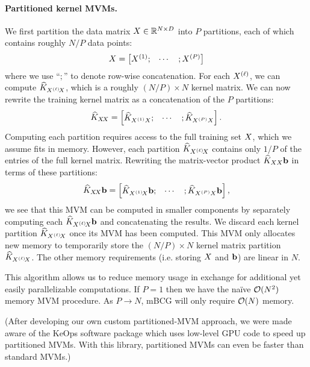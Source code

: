 \paragraph{Partitioned kernel MVMs.}
We first partition the data matrix $X \in \mathbb{R}^{N \times D}$ into $P$ partitions, each of which contains roughly $N/P$ data points:
%
\[
  X = \begin{bmatrix}
    X^{(1)}; &
    \cdots &
    ; X^{(P)}
  \end{bmatrix}
\]
%
where we use ``$;$'' to denote row-wise concatenation.
For each $X^{(\ell)}$, we can compute $\widehat {K}_{X^{(\ell)}\!X}$, which is a roughly $(N / P) \times N$ kernel matrix.
We can now rewrite the training kernel matrix as a concatenation of the $P$ partitions:
%
\[
  \widehat {K}_{X\!X} = \begin{bmatrix}
      \widehat {K}_{X^{(1)}X}; &
    \cdots &
    ; \widehat {K}_{X^{(P)}X}
  \end{bmatrix}.
\]
%
Computing each partition requires access to the full training set $X$, which we assume fits in memory.
However, each partition $\widehat {K}_{X^{(\ell)}\!X}$ contains only $1/P$ of the entries of the full kernel matrix.
Rewriting the matrix-vector product $\widehat{K}_{XX} \mathbf{b}$ in terms of these partitions:
%
\[
  \widehat {K}_{X\!X} \mathbf{b} = \begin{bmatrix}
    \widehat {K}_{X^{(1)}\!X} \mathbf{b}; &
    \cdots &
    ; \widehat {K}_{X^{(P)}X} \mathbf{b}
  \end{bmatrix},
\]
%
we see that this MVM can be computed in smaller components by separately computing each $\widehat {K}_{X^{(\ell)}\!X} \mathbf{b}$ and concatenating the results.
We discard each kernel partition $\widehat {K}_{X^{(\ell)}\!X}$ once its MVM has been computed.
This MVM only allocates new memory to temporarily store the $(N / P) \times N$ kernel matrix partition $\widehat {K}_{X^{(\ell)}\!X}$.
The other memory requirements (i.e. storing $X$ and $\mathbf{b}$) are linear in $N$.

This algorithm allows us to reduce memory usage in exchange for additional yet easily parallelizable computations.
If $P=1$ then we have the na\"ive $\bigo{N^2}$ memory MVM procedure. As $P \to N$, mBCG will only require $\bigo{N}$ memory.

(After developing our own custom partitioned-MVM approach, we were made aware of the KeOps software package \cite{charlier2020kernel} which uses low-level GPU code to speed up partitioned MVMs.
With this library, partitioned MVMs can even be faster than standard MVMs.)


